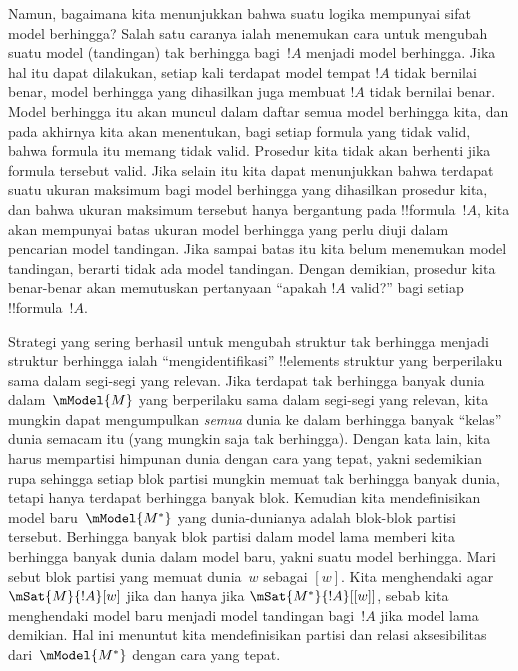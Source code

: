 \documentclass[../../../include/open-logic-section]{subfiles}
\begin{document}
Namun, bagaimana kita menunjukkan bahwa suatu logika mempunyai sifat model
berhingga? Salah satu caranya ialah menemukan cara untuk mengubah suatu model
(tandingan) tak berhingga bagi~$!A$ menjadi model berhingga. Jika hal itu dapat
dilakukan, setiap kali terdapat model tempat $!A$ tidak bernilai benar, model
berhingga yang dihasilkan juga membuat $!A$ tidak bernilai benar. Model
berhingga itu akan muncul dalam daftar semua model berhingga kita, dan pada
akhirnya kita akan menentukan, bagi setiap formula yang tidak valid, bahwa
formula itu memang tidak valid. Prosedur kita tidak akan berhenti jika formula
tersebut valid. Jika selain itu kita dapat menunjukkan bahwa terdapat suatu
ukuran maksimum bagi model berhingga yang dihasilkan prosedur kita, dan bahwa
ukuran maksimum tersebut hanya bergantung pada !!{formula}~$!A$, kita akan
mempunyai batas ukuran model berhingga yang perlu diuji dalam pencarian model
tandingan. Jika sampai batas itu kita belum menemukan model tandingan, berarti
tidak ada model tandingan. Dengan demikian, prosedur kita benar-benar akan
memutuskan pertanyaan ``apakah $!A$ valid?'' bagi setiap !!{formula}~$!A$.

Strategi yang sering berhasil untuk mengubah struktur tak berhingga menjadi
struktur berhingga ialah ``mengidentifikasi'' !!{element}s struktur yang
berperilaku sama dalam segi-segi yang relevan. Jika terdapat tak berhingga
banyak dunia dalam~$\mModel{M}$ yang berperilaku sama dalam segi-segi yang
relevan, kita mungkin dapat mengumpulkan \emph{semua} dunia ke dalam berhingga
banyak ``kelas'' dunia semacam itu (yang mungkin saja tak berhingga). Dengan
kata lain, kita harus mempartisi himpunan dunia dengan cara yang tepat, yakni
sedemikian rupa sehingga setiap blok partisi mungkin memuat tak berhingga
banyak dunia, tetapi hanya terdapat berhingga banyak blok. Kemudian kita
mendefinisikan model baru~$\mModel{M^*}$ yang dunia-dunianya adalah blok-blok
partisi tersebut. Berhingga banyak blok partisi dalam model lama memberi kita
berhingga banyak dunia dalam model baru, yakni suatu model berhingga. Mari
sebut blok partisi yang memuat dunia~$w$ sebagai $[w]$. Kita menghendaki agar
$\mSat{M}{!A}[w]$ jika dan hanya jika $\mSat{M^*}{!A}[{[w]}]$, sebab kita
menghendaki model baru menjadi model tandingan bagi~$!A$ jika model lama
demikian. Hal ini menuntut kita mendefinisikan partisi dan relasi aksesibilitas
dari~$\mModel{M^*}$ dengan cara yang tepat.
\end{document}
